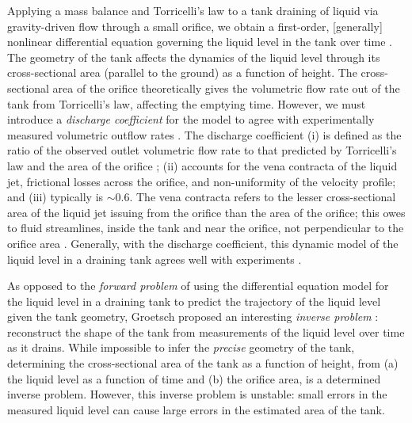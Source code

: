 \documentclass[openacc]{rsproca_new}%
\begin{document}
Applying a mass balance and Torricelli's law to a tank draining of liquid via gravity-driven flow through a small orifice, we obtain a first-order, [generally] nonlinear differential equation governing the liquid level in the tank over time \cite{groetsch1993inverse,seborg2016process,debook}.
The geometry of the tank affects the dynamics of the liquid level through its cross-sectional area (parallel to the ground) as a function of height.
The cross-sectional area of the orifice theoretically gives the volumetric flow rate out of the tank from Torricelli's law, affecting the emptying time. 
However, we must introduce a \emph{discharge coefficient} for the model to agree with experimentally measured volumetric outflow rates \cite{de2000pin,blasone2015discharge,wadhwa2021study,liu2008drainage}.
The discharge coefficient
(i) is defined as the ratio of the observed outlet volumetric flow rate to that predicted by Torricelli's law and the area of the orifice \cite{hicks2014determining};
(ii) accounts for the vena contracta of the liquid jet, frictional losses across the orifice, and non-uniformity of the velocity profile; and
(iii) typically is $\sim$0.6.
The vena contracta refers to the lesser cross-sectional area of the liquid jet issuing from the orifice than the area of the orifice; this owes to fluid streamlines, inside the tank and near the orifice, not perpendicular to the orifice area \cite{horsch2020simple}. 
\cite{teoman2022discharge,hicks2014determining,blasone2015discharge,lienhard1984velocity,wadhwa2021study}
Generally, with the discharge coefficient, this dynamic model of the liquid level in a draining tank agrees well with experiments \cite{farmer1992physical,driver1998torricelli,brady2009siphons,rother2024modelling,paldy1963apparatus,ivanov2014testing,williams2021vessel,pavesi2019investigating,planinvsivc2011holes,saleta2005experimental,lopac2015water,powell2012carrying}.

As opposed to the \emph{forward problem} of using the differential equation model for the liquid level in a draining tank to predict the trajectory of the liquid level given the tank geometry, Groetsch \cite{groetsch1993inverse,groetsch1999inverse} proposed an interesting \emph{inverse problem} \cite{groetsch1993inverse,neto2012introduction,tarantola2005inverse}: reconstruct the shape of the tank from measurements of the liquid level over time as it drains. 
While impossible to infer the \emph{precise} geometry of the tank, determining the cross-sectional area of the tank as a function of height, from (a) the liquid level as a function of time and (b) the orifice area, is a determined inverse problem. However, this inverse problem is unstable: small errors in the measured liquid level can cause large errors in the estimated area of the tank. \cite{groetsch1993inverse}
\end{document}
